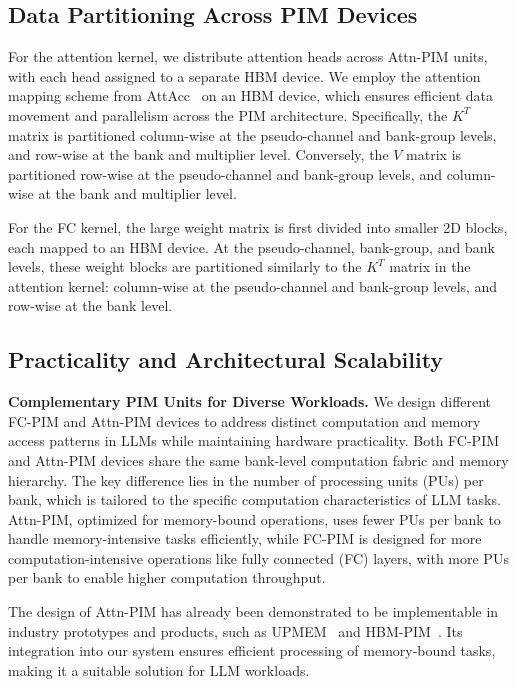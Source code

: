 \subsection{Data Partitioning Across PIM Devices}
For the attention kernel, we distribute attention heads across Attn-PIM units, with each head assigned to a separate HBM device. We employ the attention mapping scheme from AttAcc~\cite{park2024attacc} on an HBM device, which ensures efficient data movement and parallelism across the PIM architecture. Specifically, the $K^T$ matrix is partitioned column-wise at the pseudo-channel and bank-group levels, and row-wise at the bank and multiplier level. Conversely, the $V$ matrix is partitioned row-wise at the pseudo-channel and bank-group levels, and column-wise at the bank and multiplier level.


For the FC kernel, the large weight matrix is first divided into smaller 2D blocks, each mapped to an HBM device. At the pseudo-channel, bank-group, and bank levels, these weight blocks are partitioned similarly to the $K^T$ matrix in the attention kernel: column-wise at the pseudo-channel and bank-group levels, and row-wise at the bank level.


\subsection{Practicality and Architectural Scalability}

\textbf{Complementary PIM Units for Diverse Workloads.}
We design different FC-PIM and Attn-PIM devices to address distinct computation and memory access patterns in LLMs while maintaining hardware practicality.
Both FC-PIM and Attn-PIM devices share the same bank-level computation fabric and memory hierarchy. The key difference lies in the number of processing units (PUs) per bank, which is tailored to the specific computation characteristics of LLM tasks. Attn-PIM, optimized for memory-bound operations, uses fewer PUs per bank to handle memory-intensive tasks efficiently, while FC-PIM is designed for more computation-intensive operations like fully connected (FC) layers, with more PUs per bank to enable higher computation throughput.

The design of Attn-PIM has already been demonstrated to be implementable in industry prototypes and products, such as UPMEM~\cite{upmem, upmem2018,gomez2022benchmarking,gomez2023evaluating,rhyner2024pim,hyun2024pathfinding,giannoula2022sparsep,nider2021case,gomez2021benchmarkingcut} and HBM-PIM~\cite{lee2021hardware, kwon202125}. Its integration into our system ensures efficient processing of memory-bound tasks, making it a suitable solution for LLM workloads.

